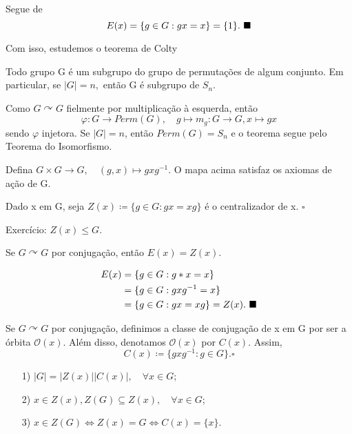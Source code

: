 \documentclass[algebra_notes.tex]{subfiles}
\begin{document}
\begin{proof*}
	Segue de
	\[
		E(x) = \{g\in G: gx = x\} = \{1\}. \text{ $\blacksquare$}
	\]
\end{proof*}
Com isso, estudemos o teorema de Colty
\hypertarget{colty}{\begin{theorem*}
		Todo grupo G é um subgrupo do grupo de permutações de algum conjunto. Em particular,
		se \(|G| = n,\) então G é subgrupo de \(S_{n}\).
	\end{theorem*}}
\begin{proof*}
	Como \(G \curvearrowright G\) fielmente por multiplicação à esquerda, então
	\[
		\varphi :G\rightarrow Perm(G),\quad g\mapsto m_{g}:G\rightarrow G, x\mapsto gx
	\]
	sendo \(\varphi \) injetora. Se \(|G|=n\), então \(Perm(G) = S_{n}\) e o teorema
	segue pelo Teorema do Isomorfismo.
\end{proof*}
\begin{example*}
	Defina \(G\times{G}\rightarrow G, \quad (g, x)\mapsto gxg^{-1}\). O mapa acima satisfaz
	os axiomas de ação de G.
\end{example*}
\begin{def*}
	Dado x em G, seja \(Z(x)\coloneqq \{g\in G: gx=xg\}\) é o centralizador de x. \(\square\)
\end{def*}
\begin{example*}
	Exercício: \(Z(x)\leq G\).
\end{example*}
\begin{prop*}
	Se \(G \curvearrowright G\) por conjugação, então \(E(x) = Z(x)\).
\end{prop*}
\begin{proof*}
	\begin{align*}
		E(x) & = \{g\in G: g * x = x\}                         \\
		     & = \{g\in G: gxg^{-1} = x\}                      \\
		     & = \{g\in G: gx = xg\} = Z(x).\text{ $\blacksquare$}
	\end{align*}
\end{proof*}
\begin{def*}
	Se \(G \curvearrowright G\) por conjugação, definimos a classe de conjugação
	de x em G por ser a órbita \(\mathcal{O}(x)\). Além disso, denotamos \(\mathcal{O}(x)\) por
	\(C(x).\) Assim,
	\[
		C(x)\coloneqq \{gxg^{-1}: g\in G\}. \square
	\]
\end{def*}
\begin{prop*}
	\begin{itemize}
		\item[1)] \(|G| = |Z(x)||C(x)|,\quad \forall x\in G\);
		\item[2)] \(x\in Z(x), Z(G)\subseteq{Z(x)}, \quad \forall x\in G\);
		\item[3)] \(x\in Z(G) \Longleftrightarrow Z(x) = G \Longleftrightarrow C(x) = \{x\}\).
	\end{itemize}
\end{prop*}
\end{document}
